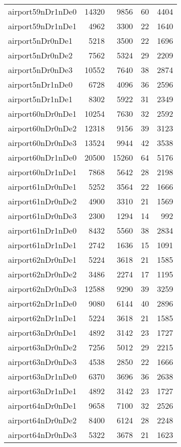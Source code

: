 \begin{tabular}{lrrrr}
airport59nDr1nDe0 & 14320 & 9856 & 60 & 4404 \\
airport59nDr1nDe1 & 4962 & 3300 & 22 & 1640 \\
airport5nDr0nDe1 & 5218 & 3500 & 22 & 1696 \\
airport5nDr0nDe2 & 7562 & 5324 & 29 & 2209 \\
airport5nDr0nDe3 & 10552 & 7640 & 38 & 2874 \\
airport5nDr1nDe0 & 6728 & 4096 & 36 & 2596 \\
airport5nDr1nDe1 & 8302 & 5922 & 31 & 2349 \\
airport60nDr0nDe1 & 10254 & 7630 & 32 & 2592 \\
airport60nDr0nDe2 & 12318 & 9156 & 39 & 3123 \\
airport60nDr0nDe3 & 13524 & 9944 & 42 & 3538 \\
airport60nDr1nDe0 & 20500 & 15260 & 64 & 5176 \\
airport60nDr1nDe1 & 7868 & 5642 & 28 & 2198 \\
airport61nDr0nDe1 & 5252 & 3564 & 22 & 1666 \\
airport61nDr0nDe2 & 4900 & 3310 & 21 & 1569 \\
airport61nDr0nDe3 & 2300 & 1294 & 14 & 992 \\
airport61nDr1nDe0 & 8432 & 5560 & 38 & 2834 \\
airport61nDr1nDe1 & 2742 & 1636 & 15 & 1091 \\
airport62nDr0nDe1 & 5224 & 3618 & 21 & 1585 \\
airport62nDr0nDe2 & 3486 & 2274 & 17 & 1195 \\
airport62nDr0nDe3 & 12588 & 9290 & 39 & 3259 \\
airport62nDr1nDe0 & 9080 & 6144 & 40 & 2896 \\
airport62nDr1nDe1 & 5224 & 3618 & 21 & 1585 \\
airport63nDr0nDe1 & 4892 & 3142 & 23 & 1727 \\
airport63nDr0nDe2 & 7256 & 5012 & 29 & 2215 \\
airport63nDr0nDe3 & 4538 & 2850 & 22 & 1666 \\
airport63nDr1nDe0 & 6370 & 3696 & 36 & 2638 \\
airport63nDr1nDe1 & 4892 & 3142 & 23 & 1727 \\
airport64nDr0nDe1 & 9658 & 7100 & 32 & 2526 \\
airport64nDr0nDe2 & 8400 & 6124 & 28 & 2248 \\
airport64nDr0nDe3 & 5322 & 3678 & 21 & 1623 \\

\end{tabular}
